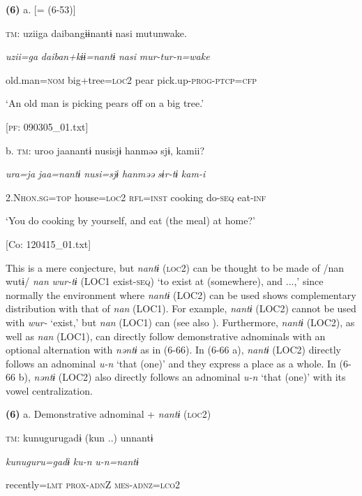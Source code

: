 \textbf{(6)}  a.  [= (6-53)]

    \textsc{tm}:  uziiga  daibangɨɨnantɨ  nasi  mutunwake.

      \textit{uzii=ga}  \textit{daiban+kɨɨ=nantɨ}  \textit{nasi}  \textit{mur-tur-n=wake}

      old.man=\textsc{nom}  big+tree=\textsc{loc}2  pear  pick.up-\textsc{prog}-\textsc{ptcp}=\textsc{cfp}

      ‘An old man is picking pears off on a big tree.’

      [\textsc{pf}: 090305\_01.txt]

  b.  \textsc{tm}:  uroo  jaanantɨ  nusisjɨ  hanməə  sjɨ,  kamii?

      \textit{ura=ja}  \textit{jaa=nantɨ}  \textit{nusi=sjɨ}  \textit{hanməə}  \textit{sɨr-tɨ}  \textit{kam-i}

      2.N\textsc{hon}.\textsc{sg}=\textsc{top}  house=\textsc{loc}2  \textsc{rfl}=\textsc{inst}  cooking  do-\textsc{seq}  eat-\textsc{inf}

      ‘You do cooking by yourself, and eat (the meal) at home?’

      [Co: 120415\_01.txt]

This is a mere conjecture, but \textit{nantɨ} (\textsc{loc}2) can be thought to be made of /nan wutɨ/ \textit{nan} \textit{wur-tɨ} (LOC1 exist-\textsc{seq}) ‘to exist at (somewhere), and ...,’ since normally the environment where \textit{nantɨ} (LOC2) can be used shows complementary distribution with that of \textit{nan} (LOC1). For example, \textit{nantɨ} (LOC2) cannot be used with \textit{wur-} ‘exist,’ but \textit{nan} (LOC1) can (see also ). Furthermore, \textit{nantɨ} (LOC2), as well as \textit{nan} (LOC1), can directly follow demonstrative adnominals with an optional alternation with \textit{nəntɨ} as in (6-66). In (6-66 a), \textit{nantɨ} (LOC2) directly follows an adnominal \textit{u-n} ‘that (one)’ and they express a place as a whole. In (6-66 b), \textit{nəntɨ} (LOC2) also directly follows an adnominal \textit{u-n} ‘that (one)’ with its vowel centralization.

\textbf{(6)}  a.  Demonstrative adnominal + \textit{nantɨ} (\textsc{loc}2)

    \textsc{tm}:  kunugurugadɨ  (kun ..)  unnantɨ

      \textit{kunuguru=gadɨ}  \textit{ku-n}  \textit{u-n=nantɨ}

      recently=\textsc{lmt}  \textsc{prox}-\textsc{adn}Z  \textsc{mes}-\textsc{adnz}=\textsc{lco}2

